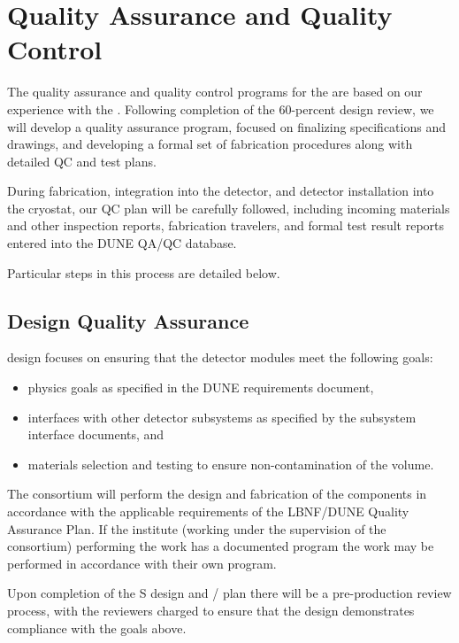 \section{Quality Assurance and Quality Control}
\label{sec:fdsp-pd-qaqc}

The quality assurance and quality control programs for the  are based on our experience with the .  Following completion of the 60-percent design review, we will develop a quality assurance program, focused on finalizing specifications and drawings, and developing a formal set of fabrication procedures along with detailed QC and test plans.

During fabrication, integration into the detector, and detector installation into the cryostat, our QC plan will be carefully followed, including incoming materials and other inspection reports, fabrication travelers, and formal test result reports entered into the DUNE QA/QC database.

Particular steps in this process are detailed below.

\subsection{Design Quality Assurance}
\label{sec:fdsp-pd-designqa}

 design  focuses on ensuring that the detector modules meet the following goals:
\begin{itemize}
\item physics goals as specified in the DUNE requirements document,
\item interfaces with other detector subsystems as specified by the subsystem interface documents, and
\item materials selection and testing to ensure non-contamination of the \lar volume.
\end{itemize}

The  consortium will perform the design and fabrication of the components in accordance with the applicable requirements of the LBNF/DUNE Quality Assurance Plan. If the institute (working under the supervision of the consortium) performing the work has a documented  program the work may be performed in accordance with their own program.

Upon completion of the S design and / plan there will be a pre-production review process, with the reviewers charged to ensure that the design demonstrates compliance with the goals above.


